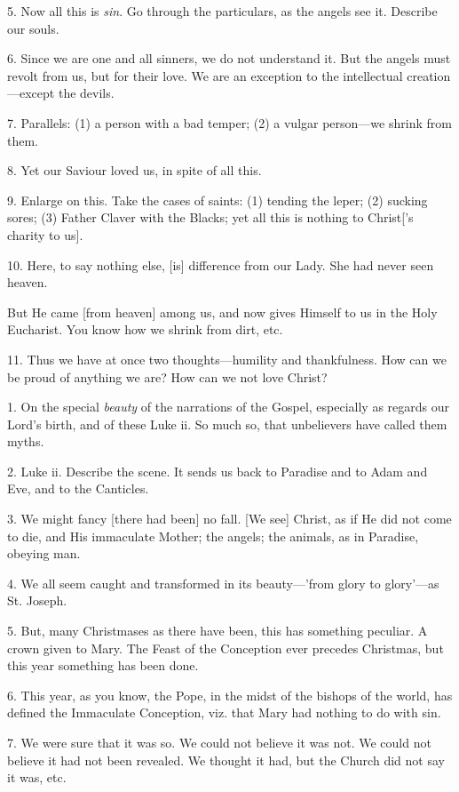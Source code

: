 5. Now all this is \emph{sin}. Go through the
particulars, as the angels see it. Describe our souls.

6. Since we are one and all sinners, we do not
understand it. But the angels must revolt from us, but for their love.
We are an exception to the intellectual creation—except the devils.

7. Parallels: (1) a person with a bad temper; (2)
a vulgar person—we shrink from them.

8. Yet our Saviour loved us, in spite of all
this.

9. Enlarge on this. Take the cases of saints: (1)
tending the leper; (2) sucking sores; (3) Father Claver with the
Blacks; yet all this is nothing to Christ['s charity to us].

10. Here, to say nothing else, [is] difference
from our Lady. She had never seen heaven.

But He came [from heaven] among us, and now gives
Himself to us in the Holy Eucharist. You know how we shrink from dirt,
etc.

11. Thus we have at once two thoughts—humility
and thankfulness. How can we be proud of anything we are? How can we
not love Christ?


1. On the special \emph{beauty} of the narrations
of the Gospel, especially as regards our Lord's birth, and of these
Luke ii. So much so, that unbelievers have called them myths.

2. Luke ii. Describe the scene. It sends us back
to Paradise and to Adam and Eve, and to the Canticles.

3. We might fancy [there had been] no fall. [We
see] Christ, as if He did not come to die, and His immaculate Mother;
the angels; the animals, as in Paradise, obeying man.

4. We all seem caught and transformed in its
beauty—'from glory to glory'—as St. Joseph.

5. But, many Christmases as there have been, this
has something peculiar. A crown given to Mary. The Feast of the
Conception ever precedes Christmas, but this year something has been
done.

6. This year, as you know, the Pope, in the midst
of the bishops of the world, has defined the Immaculate Conception,
viz. that Mary had nothing to do with sin.

7. We were sure that it was so. We could not
believe it was not. We could not believe it had not been revealed. We
thought it had, but the Church did not say it was, etc.

